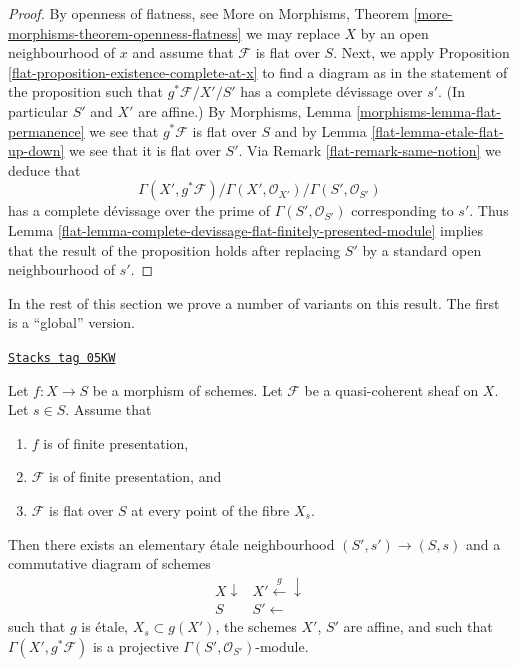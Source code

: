 \begin{proof}

By openness of flatness, see
More on Morphisms, Theorem \ref{more-morphisms-theorem-openness-flatness}
we may replace $X$ by an open neighbourhood of $x$ and assume that
$\mathcal{F}$ is flat over $S$. Next, we apply
Proposition \ref{flat-proposition-existence-complete-at-x}
to find a diagram as in the statement of the proposition such
that $g^*\mathcal{F}/X'/S'$ has a complete d\'evissage over $s'$.
(In particular $S'$ and $X'$ are affine.) By
Morphisms, Lemma \ref{morphisms-lemma-flat-permanence}
we see that $g^*\mathcal{F}$ is flat over $S$ and by
Lemma \ref{flat-lemma-etale-flat-up-down}
we see that it is flat over $S'$. Via
Remark \ref{flat-remark-same-notion}
we deduce that
$$
\Gamma(X', g^*\mathcal{F})/
\Gamma(X', \mathcal{O}_{X'})/
\Gamma(S', \mathcal{O}_{S'})
$$
has a complete d\'evissage over the prime of $\Gamma(S', \mathcal{O}_{S'})$
corresponding to $s'$. Thus
Lemma \ref{flat-lemma-complete-devissage-flat-finitely-presented-module}
implies that the result of the proposition holds after replacing
$S'$ by a standard open neighbourhood of $s'$.
\end{proof}

In the rest of this section we prove a number of variants
on this result. The first is a ``global'' version.

\begin{lemma}
\label{flat-lemma-finite-presentation-flat-along-fibre}
\href{https://stacks.math.columbia.edu/tag/05KW}{\texttt{Stacks tag 05KW}}

Let $f : X \to S$ be a morphism of schemes.
Let $\mathcal{F}$ be a quasi-coherent sheaf on $X$.
Let $s \in S$.
Assume that
\begin{enumerate}
\item $f$ is of finite presentation,
\item $\mathcal{F}$ is of finite presentation, and
\item $\mathcal{F}$ is flat over $S$ at every point of the fibre $X_s$.
\end{enumerate}
Then there exists an elementary \'etale neighbourhood
$(S', s') \to (S, s)$ and a commutative diagram of schemes
$$
\begin{array}{cc}X \downarrow & X' \overset{g}{\longleftarrow}\downarrow \\ S & S' \longleftarrow\end{array}
$$
such that $g$ is \'etale, $X_s \subset g(X')$, the schemes
$X'$, $S'$ are affine, and such that
$\Gamma(X', g^*\mathcal{F})$ is a projective
$\Gamma(S', \mathcal{O}_{S'})$-module.
\end{lemma}

